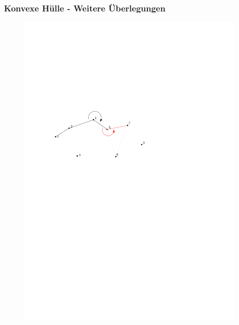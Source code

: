 \begin{frame}
	\frametitle{{Konvexe Hülle - Weitere Überlegungen}}
\begin{figure}[htbp]
	\begin{center}
  	\includegraphics[width=.8\linewidth]{bilder/graham7}
	\end{center}
\end{figure}
\end{frame}


